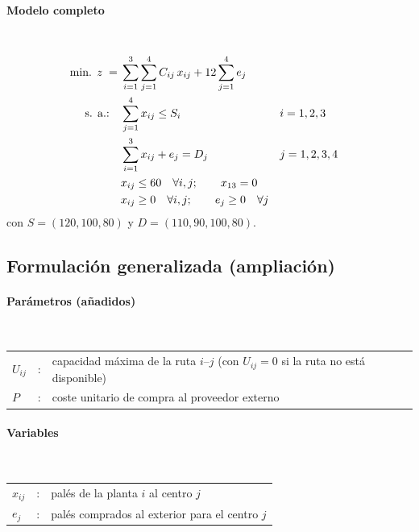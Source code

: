 \paragraph{Modelo completo}\mbox{}\\
\begin{align}
\mbox{min. } z \;=\;& \sum_{i=1}^{3}\sum_{j=1}^{4} C_{ij}\, x_{ij} + 12 \sum_{j=1}^{4} e_j \notag\\
\mbox{s. a.:}\quad
& \sum_{j=1}^{4} x_{ij} \leq S_i && i=1,2,3 \notag\\
& \sum_{i=1}^{3} x_{ij} + e_j = D_j && j=1,2,3,4 \notag\\
& x_{ij} \leq 60 \quad \forall i,j; \qquad x_{13} = 0 \notag\\
& x_{ij} \geq 0 \quad \forall i,j; \qquad e_j \geq 0 \quad \forall j \notag
\end{align}
con $S=(120,100,80)$ y $D=(110,90,100,80)$.

\subsection{Formulación generalizada (ampliación)}

\paragraph{Parámetros (añadidos)}\mbox{}\\
\begin{tabular}{l c l}
    $U_{ij}$ & : & capacidad máxima de la ruta $i$--$j$ (con $U_{ij}=0$ si la ruta no está disponible) \\
    $P$      & : & coste unitario de compra al proveedor externo \\
\end{tabular}

\paragraph{Variables}\mbox{}\\
\begin{tabular}{l c l}
    $x_{ij}$ & : & palés de la planta $i$ al centro $j$ \\
    $e_j$    & : & palés comprados al exterior para el centro $j$ \\
\end{tabular}

